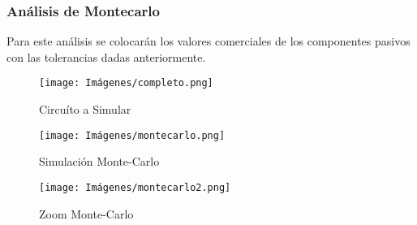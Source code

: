     \newpage
    \subsubsection{Análisis de Montecarlo}
    
    Para este análisis se colocarán los valores comerciales de los componentes pasivos con las tolerancias dadas anteriormente.\\

    \begin{figure}[ht]
        \centering
        \texttt{[image: Imágenes/completo.png]}
        \caption{Circuíto a Simular}
    \end{figure}

    \begin{figure}[ht]
        \centering
        \texttt{[image: Imágenes/montecarlo.png]}
        \caption{Simulación Monte-Carlo}
    \end{figure}

    \begin{figure}[ht]
        \centering
        \texttt{[image: Imágenes/montecarlo2.png]}
        \caption{Zoom Monte-Carlo}
    \end{figure}
    